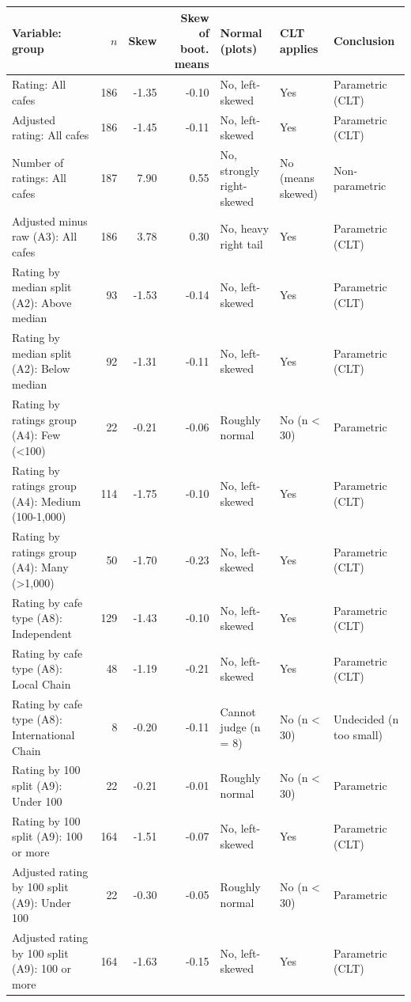 \begin{tabular}{p{5.2cm}rrrp{2.6cm}p{2.2cm}p{2.6cm}}
\toprule
Variable: group & $n$ & Skew & Skew of boot. means & Normal (plots) & CLT applies & Conclusion \\
\midrule
Rating: All cafes & 186 & -1.35 & -0.10 & No, left-skewed & Yes & Parametric (CLT) \\
Adjusted rating: All cafes & 186 & -1.45 & -0.11 & No, left-skewed & Yes & Parametric (CLT) \\
Number of ratings: All cafes & 187 & 7.90 & 0.55 & No, strongly right-skewed & No (means skewed) & Non-parametric \\
Adjusted minus raw (A3): All cafes & 186 & 3.78 & 0.30 & No, heavy right tail & Yes & Parametric (CLT) \\
Rating by median split (A2): Above median & 93 & -1.53 & -0.14 & No, left-skewed & Yes & Parametric (CLT) \\
Rating by median split (A2): Below median & 92 & -1.31 & -0.11 & No, left-skewed & Yes & Parametric (CLT) \\
Rating by ratings group (A4): Few (\textless{}100) & 22 & -0.21 & -0.06 & Roughly normal & No (n \textless{} 30) & Parametric \\
Rating by ratings group (A4): Medium (100-1,000) & 114 & -1.75 & -0.10 & No, left-skewed & Yes & Parametric (CLT) \\
Rating by ratings group (A4): Many (\textgreater{}1,000) & 50 & -1.70 & -0.23 & No, left-skewed & Yes & Parametric (CLT) \\
Rating by cafe type (A8): Independent & 129 & -1.43 & -0.10 & No, left-skewed & Yes & Parametric (CLT) \\
Rating by cafe type (A8): Local Chain & 48 & -1.19 & -0.21 & No, left-skewed & Yes & Parametric (CLT) \\
Rating by cafe type (A8): International Chain & 8 & -0.20 & -0.11 & Cannot judge (n = 8) & No (n \textless{} 30) & Undecided (n too small) \\
Rating by 100 split (A9): Under 100 & 22 & -0.21 & -0.01 & Roughly normal & No (n \textless{} 30) & Parametric \\
Rating by 100 split (A9): 100 or more & 164 & -1.51 & -0.07 & No, left-skewed & Yes & Parametric (CLT) \\
Adjusted rating by 100 split (A9): Under 100 & 22 & -0.30 & -0.05 & Roughly normal & No (n \textless{} 30) & Parametric \\
Adjusted rating by 100 split (A9): 100 or more & 164 & -1.63 & -0.15 & No, left-skewed & Yes & Parametric (CLT) \\
\bottomrule
\end{tabular}
